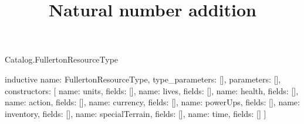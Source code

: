 \begin{lexlean}{Catalog.FullertonResourceType}
\title{Natural number addition}
\begin{semanticmodule}
inductive{
  name: FullertonResourceType,
  type_parameters: [],
  parameters: [],
  constructors: [
    {name: units, fields: []},
    {name: lives, fields: []},
    {name: health, fields: []},
    {name: action, fields: []},
    {name: currency, fields: []},
    {name: powerUps, fields: []},
    {name: inventory, fields: []},
    {name: specialTerrain, fields: []},
    {name: time, fields: []}
  ]
}
\end{semanticmodule}
\end{lexlean}

